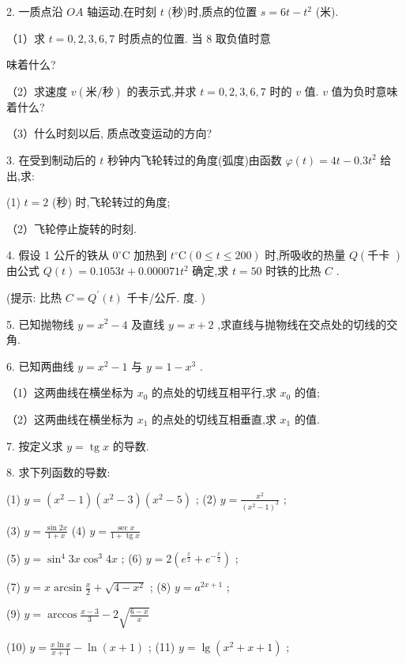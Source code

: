 \documentclass[10pt]{article}
\begin{document}
2. 一质点沿 \({OA}\) 轴运动,在时刻 \(t\) (秒)时,质点的位置 \(s = {6t} - {t}^{2}\) (米).

（1）求 \(t = 0,2,3,6,7\) 时质点的位置. 当 8 取负值时意

味着什么?

（2）求速度 \(v\left( {\text{米}/\text{秒}}\right)\) 的表示式,并求 \(t = 0,2,3,6,7\) 时的 \(v\) 值. \(v\) 值为负时意味着什么?

（3）什么时刻以后, 质点改变运动的方向?

3. 在受到制动后的 \(t\) 秒钟内飞轮转过的角度(弧度)由函数 \(\varphi \left( t\right) = {4t} - {0.3}{t}^{2}\) 给出,求:

(1) \(t = 2\) (秒) 时,飞轮转过的角度;

（2）飞轮停止旋转的时刻.

4. 假设 1 公斤的铁从 \({0}^{ \circ }\mathrm{C}\) 加热到 \({t}^{ \circ }\mathrm{C}\left( {0 \leq t \leq {200}}\right)\) 时,所吸收的热量 \(Q\left( \text{千卡 }\right)\) 由公式 \(Q\left( t\right) = {0.1053t} + {0.000071}{t}^{2}\) 确定,求 \(t = {50}\) 时铁的比热 \(C\) .

(提示: 比热 \(C = {Q}^{\prime }\left( t\right)\) 千卡/公斤. 度. )

5. 已知抛物线 \(y = {x}^{2} - 4\) 及直线 \(y = x + 2\) ,求直线与抛物线在交点处的切线的交角.

6. 已知两曲线 \(y = {x}^{2} - 1\) 与 \(y = 1 - {x}^{3}\) .

（1）这两曲线在横坐标为 \({x}_{0}\) 的点处的切线互相平行,求 \({x}_{0}\) 的值;

（2）这两曲线在横坐标为 \({x}_{1}\) 的点处的切线互相垂直,求 \({x}_{1}\) 的值.

7. 按定义求 \(y = \operatorname{tg}x\) 的导数.

8. 求下列函数的导数:

(1) \(y = \left( {{x}^{2} - 1}\right) \left( {{x}^{2} - 3}\right) \left( {{x}^{2} - 5}\right)\) ; (2) \(y = \frac{{x}^{2}}{{\left( {x}^{2} - 1\right) }^{3}}\) ;

(3) \(y = \frac{\sin {2x}}{1 + x}\) (4) \(y = \frac{\sec x}{1 + \operatorname{tg}x}\)

(5) \(y = {\sin }^{4}{3x}{\cos }^{3}{4x}\) ; (6) \(y = 2\left( {{e}^{\frac{x}{2}} + {e}^{-\frac{x}{2}}}\right)\) ;

(7) \(y = x\arcsin \frac{x}{2} + \sqrt{4 - {x}^{2}}\) ; (8) \(y = {a}^{{2x} + 1}\) ;

(9) \(y = \arccos \frac{x - 3}{3} - 2\sqrt{\frac{6 - x}{x}}\)

(10) \(y = \frac{x\ln x}{x + 1} - \ln \left( {x + 1}\right)\) ; (11) \(y = \lg \left( {{x}^{2} + x + 1}\right)\) ;
\end{document}
